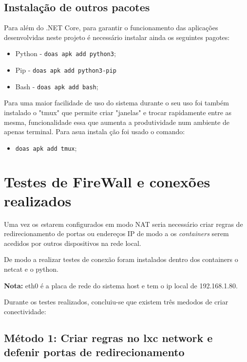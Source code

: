 \subsection{Instalação de outros pacotes}

Para além do .NET Core, para garantir o funcionamento das aplicações desenvolvidas neste projeto é necessário
instalar ainda os seguintes pagotes:
\begin{itemize}
    \item Python - \texttt{doas apk add python3};
    \item Pip - \texttt{doas apk add python3-pip}
    \item Bash - \texttt{doas apk add bash};
\end{itemize}


Para uma maior facilidade de uso do sistema durante o seu uso foi também instalado
o "tmux" que permite criar "janelas" e trocar rapidamente entre as mesma, funcionalidade
essa que aumenta a produtividade num ambiente de apenas terminal.
Para asua instala ção foi usado o comando:
\begin{itemize}
    \item \texttt{doas apk add tmux};
\end{itemize}










\section{Testes de FireWall e conexões realizados}

Uma vez os \textit estarem configurados em modo NAT seria necessário criar regras 
de redirecionamento de portas ou endereços IP de modo a os \textit{containers} serem acedidos
por outros dispositivos na rede local.


De modo a realizar testes de conexão foram instalados dentro dos containers
o netcat e o python.

\textbf{Nota:} eth0 é a placa de rede do sistema host e tem o ip local de 192.168.1.80.


Durante os testes realizados, concluiu-se que existem três medodos de criar conectividade:

\subsection{Método 1: Criar regras no lxc network e defenir portas de redirecionamento}

